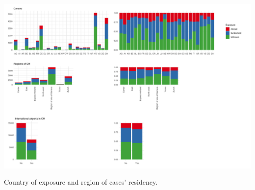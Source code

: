 \documentclass[10pt, a4paper, twoside]{article}
\begin{document}
\clearpage
\begin{suppfigure}[h]
\centering
\includegraphics[scale=0.1]{SF3_2021-06-02.png}
\caption{Country of exposure and region of cases' residency.}
\label{sf3}
\end{suppfigure}
\end{document}

